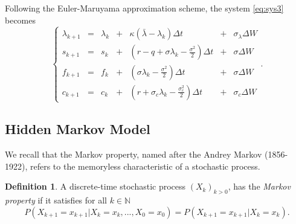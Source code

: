 \documentclass{article}
\theoremstyle{definition}
\newtheorem{definition}[thm]{Definition}
\theoremstyle{remark}
\newcommand{\measure}[1]{\ensuremath{\mathbb{#1}}}
\newcommand{\Ito}{It\^{o} }
\newcommand{\processD}[1]{\ensuremath{(#1_k)_{k>0}}}
\begin{document}

Following the Euler-Maruyama approximation scheme, the system \eqref{eq:sys3} becomes
\begin{equation}\label{eq:sys4}
\boxed{
\left\{ \begin{array}{lcrcrcr}
			\lambda_{k+1} & = & \lambda_k &+& \kappa(\bar{\lambda}-\lambda_k)\Delta t & + & \sigma_\lambda \Delta W\\
			s_{k+1} & = & s_k &+& (r-q+\sigma\lambda_k-\frac{\sigma^2}{2}) \Delta t & + & \sigma  \Delta W \\ 
			f_{k+1} & = & f_k &+& (\sigma\lambda_k-\frac{\sigma^2}{2}) \Delta t & + & \sigma  \Delta W \\ 
			c_{k+1} & = & c_k &+& (r+\sigma_c\lambda_k-\frac{\sigma_c^2}{2})\Delta t &+& \sigma_c \Delta W
        \end{array} \right. .
}
\end{equation}












\subsection{Hidden Markov Model}
We recall that the Markov property, named after the Andrey Markov (1856-1922), refers to the memoryless characteristic of a stochastic process. 

\begin{definition}
A discrete-time stochastic process \processD{X}, has the \emph{Markov property} if it satisfies for all $k \in \measure{N}$
$$P(X_{k+1}=x_{k+1}|X_{k}=x_k,...,X_{0}=x_0)=P(X_{k+1}=x_{k+1}|X_k=x_k).$$
\end{definition}
\end{document}
